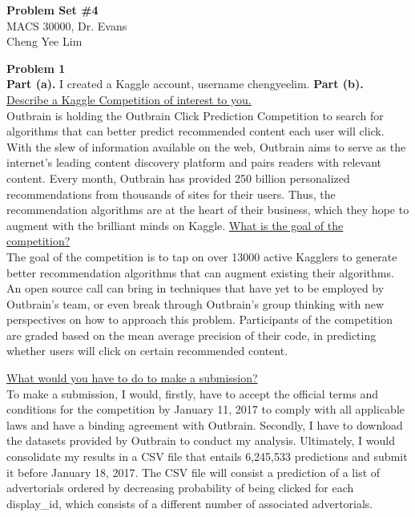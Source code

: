 \documentclass[letterpaper,12pt]{article}
\theoremstyle{definition}
\begin{document}
\begin{flushleft}
  \textbf{\large{Problem Set \#4}} \\
  MACS 30000, Dr. Evans \\
  Cheng Yee Lim
\end{flushleft}

\vspace{5mm}

\noindent\textbf{Problem 1}\\
\flushleft
\textbf{Part (a).}
I created a Kaggle account, username chengyeelim. 
\flushleft
\textbf{Part (b).}\\
\flushleft
\underline {Describe a Kaggle Competition of interest to you.} \\
\flushleft
Outbrain is holding the Outbrain Click Prediction Competition to search for algorithms that can better predict recommended content each user will click. With the slew of information available on the web, Outbrain aims to serve as the internet’s leading content discovery platform and pairs readers with relevant content. Every month, Outbrain has provided 250 billion personalized recommendations from thousands of sites for their users. Thus, the recommendation algorithms are at the heart of their business, which they hope to augment with the brilliant minds on Kaggle. 
\flushleft
\underline {What is the goal of the competition?} \\
\flushleft
The goal of the competition is to tap on over 13000 active Kagglers to generate better recommendation algorithms that can augment existing their algorithms. An open source call can bring in techniques that have yet to be employed by Outbrain’s team, or even break through Outbrain’s group thinking with new perspectives on how to approach this problem. Participants of the competition are graded based on the mean average precision of their code, in predicting whether users will click on certain recommended content. 

\flushleft
\underline {What would you have to do to make a submission?} \\
\flushleft
To make a submission, I would, firstly, have to accept the official terms and conditions for the competition by January 11, 2017 to comply with all applicable laws and have a binding agreement with Outbrain. Secondly, I have to download the datasets provided by Outbrain to conduct my analysis. Ultimately, I would consolidate my results in a CSV file that entails 6,245,533 predictions and submit it before January 18, 2017. The CSV file will consist a prediction of a list of advertorials ordered by decreasing probability of being clicked for each display\_id, which consists of a different number of associated advertorials.\
\end{document}
